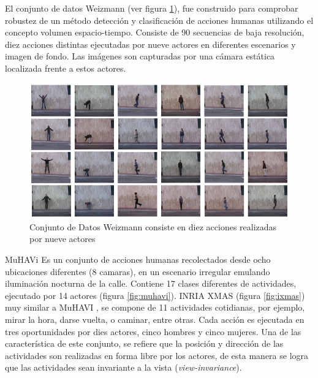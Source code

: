 El conjunto de datos Weizmann \cite {gorelick_actions_2007} (ver figura \ref{fig:weizmann}), fue construido para comprobar robustez de un método detección y clasificación de acciones humanas utilizando el concepto volumen espacio-tiempo. Consiste de 90 secuencias de baja resolución, diez acciones distintas ejecutadas por nueve actores en diferentes escenarios y imagen de fondo. Las imágenes son capturadas por una cámara estática localizada frente a estos actores. 

\begin{figure}[h!]
\centering
\includegraphics[scale=0.5]{img/ch2/Weizmann}
\caption[Weizmann Dataset]{Conjunto de Datos Weizmann consiste en diez acciones realizadas por nueve actores}
\label{fig:weizmann}
\end{figure}


MuHAVi \cite{singh_muhavi_2010} Es un conjunto de acciones humanas recolectados desde ocho ubicaciones diferentes (8 camaras), en un escenario irregular emulando iluminación nocturna de la calle. Contiene 17 clases diferentes de actividades, ejecutado por 14 actores (figura \ref{fig:muhavi}). INRIA XMAS \cite{weinland_free_2006} (figura \ref{fig:ixmas}) muy similar a MuHAVI \cite{singh_muhavi_2010}, se compone de 11 actividades cotidianas, por ejemplo, mirar la hora, darse vuelta, o caminar, entre otras. Cada acción es ejecutada en tres oportunidades por dies actores, cinco hombres y cinco mujeres. Una de las característica de este conjunto, se refiere que la posición y dirección de las actividades son realizadas en forma libre por los actores, de esta manera se logra que las actividades sean invariante a la vista (\textit{view-invariance}). 



